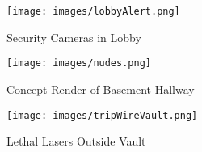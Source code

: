 \documentclass[10pt]{report}
\begin{document}
\begin{figure}[H]
    \centering
	\texttt{[image: images/lobbyAlert.png]}
    \caption{Security Cameras in Lobby}
\end{figure}

\begin{figure}[H]
    \centering
	\texttt{[image: images/nudes.png]}
    \caption{Concept Render of Basement Hallway}
\end{figure}

\begin{figure}[H]
    \centering
    \texttt{[image: images/tripWireVault.png]}
    \caption{Lethal Lasers Outside Vault}
\end{figure}
\end{document}
